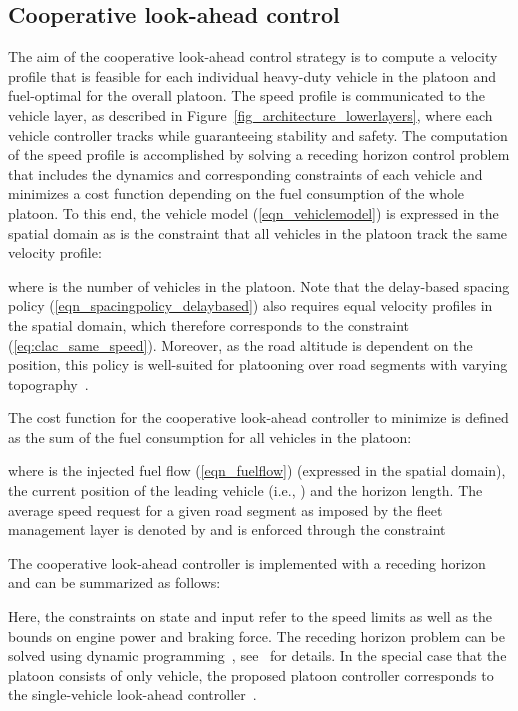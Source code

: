 \documentclass[journal]{IEEEtran}
\begin{document}
\subsection{Cooperative look-ahead control}\label{sec_clac}
The aim of the cooperative look-ahead control strategy is to compute a velocity profile  that is feasible for each individual heavy-duty vehicle in the platoon and fuel-optimal for the overall platoon. The speed profile is communicated to the vehicle layer, as described in Figure~\ref{fig_architecture_lowerlayers}, where each vehicle controller tracks  while guaranteeing stability and safety. The computation of the speed profile is accomplished by solving a receding horizon control problem that includes the dynamics and corresponding constraints of each vehicle and minimizes a cost function depending on the fuel consumption of the whole platoon. To this end, the vehicle model (\ref{eqn_vehiclemodel}) is expressed in the spatial domain as is the constraint that all vehicles in the platoon track the same velocity profile:

where  is the number of vehicles in the platoon. Note that the delay-based spacing policy (\ref{eqn_spacingpolicy_delaybased}) also requires equal velocity profiles in the spatial domain, which therefore corresponds to the constraint (\ref{eq:clac_same_speed}). Moreover, as the road altitude is dependent on the position, this policy is well-suited for platooning over road segments with varying topography~\cite{turri_2015}.

The cost function for the cooperative look-ahead controller to minimize is defined as the sum of the fuel consumption for all vehicles in the platoon:

where  is the injected fuel flow (\ref{eqn_fuelflow}) (expressed in the spatial domain),  the current position of the leading vehicle (i.e., ) and  the horizon length. The average speed request for a given road segment as imposed by the fleet management layer is denoted by  and is enforced through the constraint


The cooperative look-ahead controller is implemented with a receding horizon and can be summarized as follows:

Here, the constraints on state and input refer to the speed limits as well as the bounds on engine power and braking force. The receding horizon problem can be solved using dynamic programming~\cite{book_bellman_1957}, see~\cite{turri_2015} for details. In the special case that the platoon consists of only  vehicle, the proposed platoon controller corresponds to the single-vehicle look-ahead controller~\cite{hellstrom_2009}.
\end{document}
